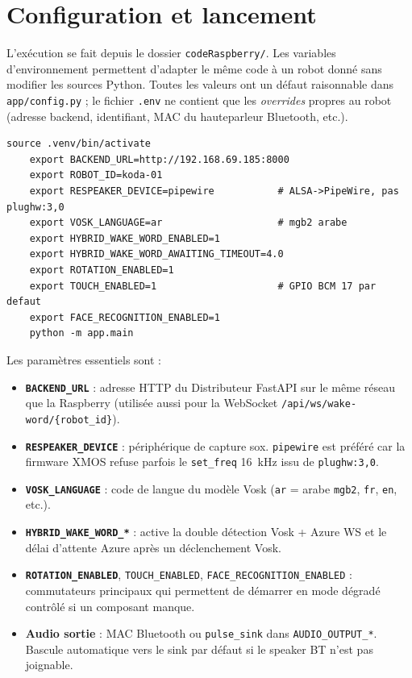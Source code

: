 \documentclass[a4paper,12pt]{report}
\begin{document}
	\section{Configuration et lancement}
	
	L'exécution se fait depuis le dossier \texttt{codeRaspberry/}. Les variables
	d'environnement permettent d'adapter le même code à un robot donné sans
	modifier les sources Python. Toutes les valeurs ont un défaut raisonnable
	dans \texttt{app/config.py} ; le fichier \texttt{.env} ne contient que les
	\emph{overrides} propres au robot (adresse backend, identifiant, MAC du
	hauteparleur Bluetooth, etc.).
	
	\begin{lstlisting}[style=kodatest, language=shellkoda, caption={Lancement du logiciel embarqué Raspberry Pi}]
	source .venv/bin/activate
	export BACKEND_URL=http://192.168.69.185:8000
	export ROBOT_ID=koda-01
	export RESPEAKER_DEVICE=pipewire           # ALSA->PipeWire, pas plughw:3,0
	export VOSK_LANGUAGE=ar                    # mgb2 arabe
	export HYBRID_WAKE_WORD_ENABLED=1
	export HYBRID_WAKE_WORD_AWAITING_TIMEOUT=4.0
	export ROTATION_ENABLED=1
	export TOUCH_ENABLED=1                     # GPIO BCM 17 par defaut
	export FACE_RECOGNITION_ENABLED=1
	python -m app.main
	\end{lstlisting}
	
	Les paramètres essentiels sont :
	\begin{itemize}
		\item \textbf{\texttt{BACKEND\_URL}} : adresse HTTP du Distributeur
		FastAPI sur le même réseau que la Raspberry (utilisée aussi pour la
		WebSocket \texttt{/api/ws/wake-word/\{robot\_id\}}).
		\item \textbf{\texttt{RESPEAKER\_DEVICE}} : périphérique de capture sox.
		\texttt{pipewire} est préféré car la firmware XMOS refuse parfois le
		\texttt{set\_freq} 16~kHz issu de \texttt{plughw:3,0}.
		\item \textbf{\texttt{VOSK\_LANGUAGE}} : code de langue du modèle Vosk
		(\texttt{ar} = arabe \texttt{mgb2}, \texttt{fr}, \texttt{en}, etc.).
		\item \textbf{\texttt{HYBRID\_WAKE\_WORD\_*}} : active la double détection
		Vosk + Azure WS et le délai d'attente Azure après un déclenchement Vosk.
		\item \textbf{\texttt{ROTATION\_ENABLED}}, \texttt{TOUCH\_ENABLED},
		\texttt{FACE\_RECOGNITION\_ENABLED} : commutateurs principaux qui
		permettent de démarrer en mode dégradé contrôlé si un composant manque.
		\item \textbf{Audio sortie} : MAC Bluetooth ou \texttt{pulse\_sink} dans
		\texttt{AUDIO\_OUTPUT\_*}. Bascule automatique vers le sink par défaut
		si le speaker BT n'est pas joignable.
	\end{itemize}
	
\end{document}
